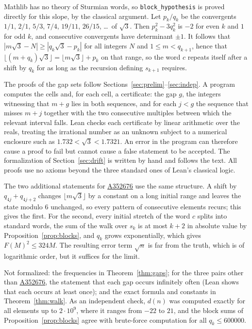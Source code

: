 \documentclass[12pt]{article}
\newcommand{\seqnum}[1]{\href{https://oeis.org/#1}{\underline{#1}}}
\newcommand{\fl}[1]{\lfloor #1 \rfloor}
\theoremstyle{plain}
\theoremstyle{remark}
\begin{document}
\begin{sloppypar}
Mathlib has no theory of Sturmian words, so \texttt{block\_hypothesis} is proved directly for
this slope, by the classical argument. Let $p_k/q_k$ be the convergents
$1/1$, $2/1$, $5/3$, $7/4$, $19/11$, $26/15$, \dots\ of $\sqrt3$. Then $p_k^2-3q_k^2$ is $-2$ for even $k$ and $1$ for odd $k$,
and consecutive convergents have determinant $\pm1$. It follows that
$|m\sqrt3-N|\ge|q_k\sqrt3-p_k|$ for all integers $N$ and $1\le m<q_{k+1}$, hence that
$\fl{(m+q_k)\sqrt3}=\fl{m\sqrt3}+p_k$ on that range, so the word $c$ repeats itself after a shift
by $q_k$ for as long as the recursion defining $s_{k+1}$ requires.
\end{sloppypar}

The proofs of the gap sets follow Sections~\ref{sec:prelim}--\ref{sec:indep}. A program computes
the cells and, for each cell, a certificate: the gap $g$, the integers witnessing that $m+g$ lies
in both sequences, and for each $j<g$ the sequence that misses $m+j$ together with the two
consecutive multiples between which the relevant interval falls. Lean checks each certificate by
linear arithmetic over the reals, treating the irrational number as an unknown subject to a
numerical enclosure such as $1.732<\sqrt3<1.7321$. An error in the program can therefore cause a
proof to fail but cannot cause a false statement to be accepted. The formalization of
Section~\ref{sec:drift} is written by hand and follows the text. All proofs use no axioms beyond
the three standard ones of Lean's classical logic.

The two additional statements for \seqnum{A352676} use the same structure. A shift by
$q_{4j}+q_{4j+2}$ changes $\fl{m\sqrt3}$ by a constant on a long initial range and leaves the
state modulo $6$ unchanged, so every pattern of consecutive elements recurs; this gives the first.
For the second, every initial stretch of the word $c$ splits into standard words, the sum of the
walk over $s_k$ is at most $k+2$ in absolute value by Proposition~\ref{prop:blocks}, and $q_k$
grows exponentially, which gives $F(M)^2\le 324M$. The resulting error term $\sqrt n$ is far from
the truth, which is of logarithmic order, but it suffices for the limit.

Not formalized: the frequencies in Theorem~\ref{thm:gaps}; for the three pairs other than
\seqnum{A352676}, the statement that each gap occurs infinitely often (Lean shows that each
occurs at least once); and the exact formula and constants in Theorem~\ref{thm:walk}. As an
independent check, $d(n)$ was computed exactly for all elements up to $2\cdot10^9$, where it
ranges from $-22$ to $21$, and the block sums of Proposition~\ref{prop:blocks} agree with
brute-force computation for all $q_k\le 600000$.
\end{document}

